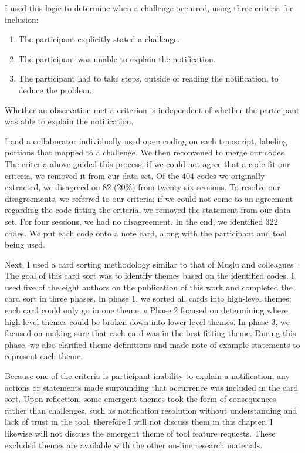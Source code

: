 I used this logic to determine when a challenge occurred, using three criteria for inclusion: 
\begin{enumerate}
    \item The participant explicitly stated a challenge.
    \item The participant was unable to explain the notification.
    \item The participant had to take steps, outside of reading the notification, to deduce the problem.
\end{enumerate}

Whether an observation met a criterion is independent of whether the participant was able to explain the notification.

I and a collaborator individually used open coding on each transcript, labeling portions that mapped to a challenge. We then reconvened to merge our codes. The criteria above guided this process; if we could not agree that a code fit our criteria, we removed it from our data set. 
Of the 404 codes we originally extracted, we disagreed on 82 (20\%) from twenty-six sessions. 
To resolve our disagreements, we referred to our criteria; if we could not come to an agreement regarding the code fitting the criteria, we removed the statement from our data set. 
For four sessions, we had no disagreement.
In the end, we identified 322 codes. We put each code onto a note card, along with the participant and tool being used. 

Next, I used a card sorting methodology similar to that of Mu\c{s}lu and
colleagues~\cite{Muslu:2014:Transition}. 
The goal of this card sort was to identify themes based on the identified codes.
I used five of the eight authors on the publication of this work and completed the card sort in three phases. In phase 1, we sorted all cards into high-level themes; each card could only go in one theme. s
Phase 2 focused on determining where high-level themes could be broken down into lower-level themes.
In phase 3, we focused on making sure that each card was in the best fitting theme. During this phase, we also clarified theme definitions and made note of example statements to represent each theme.

Because one of the criteria is participant inability to explain a notification, 
any actions or statements made surrounding that occurrence was included in the card sort. 
Upon reflection, some emergent themes took the form of consequences rather than challenges, 
such as notification resolution without understanding and lack of trust in the tool, 
therefore I will not discuss them in this chapter. 
I likewise will not discuss the emergent theme of tool feature requests.
These excluded themes are available with the other on-line research materials.

